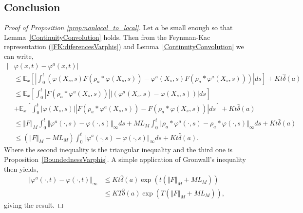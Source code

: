 \documentclass[a4paper,12pt]{article}
\newcommand{\EE}{\mathbb{E}}
\newcommand{\1}{{\bf {1}}}
\begin{document}
\subsection{Conclusion}
\begin{proof}[Proof of Proposition \ref{prop:nonlocal_to_local}]
Let $a$ be small enough so that Lemma~\ref{ContinuityConvolution} holds. Then from the Feynman-Kac representation (\ref{FK:diferencesVarphis}) and Lemma~\ref{ContinuityConvolution} we can write,
\begin{align*}
| &\varphi(x,t) - \varphi^a(x,t)|  \\ & \leq \EE_x\left[ |\int_0^t (\varphi(X_s,s)F(\rho_a*\varphi(X_s,s))-\varphi^a(X_s,s)F(\rho_a*\varphi^a(X_s,s)))| ds \right] +K t \widehat{\delta}(a)   \\ & \leq \EE_x[ \int_0^t |F(\rho_a*\varphi^a(X_s,s))||(\varphi^a(X_s,s)-\varphi(X_s,s))| ds  ] \\ & +  \EE_x[\int_0^t |\varphi(X_s,s)| |F(\rho_a*\varphi^a(X_s,s))-F(\rho_a*\varphi(X_s,s))| ds ] + K t \widehat{\delta}(a)  \\ & \leq \Vert F \Vert_M \int_0^t \Vert \varphi^a(\cdot,s) - \varphi(\cdot,s) \Vert_\infty ds  + M L_M \int_0^t \Vert \rho_a*\varphi^a(\cdot,s)-\rho_a*\varphi(\cdot,s) \Vert_\infty ds + K t \widehat{\delta}(a)  \\ & \leq (\Vert F \Vert_M + M L_M) \int_0^t \Vert \varphi^a(\cdot,s) - \varphi(\cdot,s) \Vert_\infty ds + K t \widehat{\delta}(a).
\end{align*}
Where the second inequality is the triangular inequality and the third one is Proposition~\ref{BoundednessVarphis}. A simple application of Gronwall's inequality then yields,
\begin{align*}
\Vert \varphi^a(\cdot,t)-\varphi(\cdot,t)\Vert_\infty &\leq K t \widehat{\delta}(a)  \exp(t (\Vert F \Vert_M + M L_M)) \\ & \leq  K T \widehat{\delta}(a)  \exp(T(\Vert F \Vert_M + M L_M)),
\end{align*}
giving the result.
\end{proof}

\printbibliography
\end{document}
